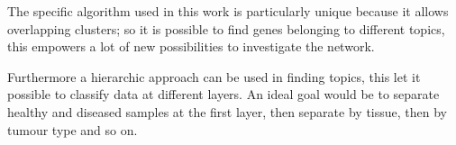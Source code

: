 The specific algorithm used in this work is particularly unique because it 
allows overlapping clusters; so it is possible to find genes belonging to 
different topics, this empowers a lot of new possibilities to investigate the network. 

Furthermore a hierarchic approach can be used in finding topics, this let it possible to classify data
at different layers. An ideal goal would be to separate healthy and diseased 
samples at the first layer, then separate by tissue, then by tumour type and so 
on. 
